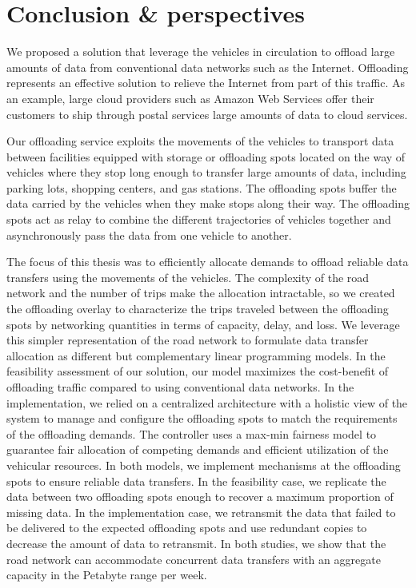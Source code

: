 \chapter{Conclusion \& perspectives}


We proposed a solution that leverage the vehicles in circulation to offload large amounts of data from conventional data networks such as the Internet. Offloading represents an effective solution to relieve the Internet from part of this traffic. As an example, large cloud providers such as Amazon Web Services offer their customers to ship through postal services large amounts of data to cloud services.

Our offloading service exploits the movements of the vehicles to transport data between facilities equipped with storage or offloading spots located on the way of vehicles where they stop long enough to transfer large amounts of data, including parking lots, shopping centers, and gas stations. The offloading spots buffer the data carried by the vehicles when they make stops along their way. The offloading spots act as relay to combine the different trajectories of vehicles together and asynchronously pass the data from one vehicle to another. 

The focus of this thesis was to efficiently allocate demands to offload reliable data transfers using the movements of the vehicles. The complexity of the road network and the number of trips make the allocation intractable, so we created the offloading overlay to characterize the trips traveled between the offloading spots by networking quantities in terms of capacity, delay, and loss. We leverage this simpler representation of the road network to formulate data transfer allocation as different but complementary linear programming models. In the feasibility assessment of our solution, our model maximizes the cost-benefit of offloading traffic compared to using conventional data networks. In the implementation, we relied on a centralized architecture with a holistic view of the system to manage and configure the offloading spots to match the requirements of the offloading demands. The controller uses a max-min fairness model to guarantee fair allocation of competing demands and efficient utilization of the vehicular resources. In both models, we implement mechanisms at the offloading spots to ensure reliable data transfers. In the feasibility case, we replicate the data between two offloading spots enough to recover a maximum proportion of missing data. In the implementation case, we retransmit the data that failed to be delivered to the expected offloading spots and use redundant copies to decrease the amount of data to retransmit. In both studies, we show that the road network can accommodate concurrent data transfers with an aggregate capacity in the Petabyte range per week.

